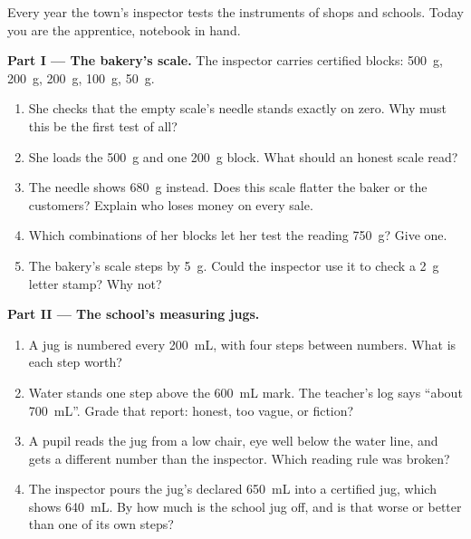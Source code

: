\begin{problem}\label{pb:g6:measurement-in-science:1}
Every year the town's inspector tests the instruments of shops and
schools. Today you are the apprentice, notebook in hand.

\medskip\noindent\textbf{Part I --- The bakery's scale.}
The inspector carries certified blocks: \qty{500}{g},
\qty{200}{g}, \qty{200}{g}, \qty{100}{g}, \qty{50}{g}.
\begin{enumerate}
  \item She checks that the empty scale's needle stands exactly on
        zero. Why must this be the first test of all?
  \item She loads the \qty{500}{g} and one \qty{200}{g} block. What
        should an honest scale read?
  \item The needle shows \qty{680}{g} instead. Does this scale
        flatter the baker or the customers? Explain who loses
        money on every sale.
  \item Which combinations of her blocks let her test the reading
        \qty{750}{g}? Give one.
  \item The bakery's scale steps by \qty{5}{g}. Could the
        inspector use it to check a \qty{2}{g} letter stamp?
        Why not?
\end{enumerate}

\medskip\noindent\textbf{Part II --- The school's measuring jugs.}
\begin{enumerate}[resume]
  \item A jug is numbered every \qty{200}{mL}, with four steps
        between numbers. What is each step worth?
  \item Water stands one step above the \qty{600}{mL} mark. The
        teacher's log says ``about \qty{700}{mL}''. Grade that
        report: honest, too vague, or fiction?
  \item A pupil reads the jug from a low chair, eye well below the
        water line, and gets a different number than the
        inspector. Which reading rule was broken?
  \item The inspector pours the jug's declared \qty{650}{mL} into
        a certified jug, which shows \qty{640}{mL}. By how much is
        the school jug off, and is that worse or better than one
        of its own steps?
\end{enumerate}


\end{problem}
